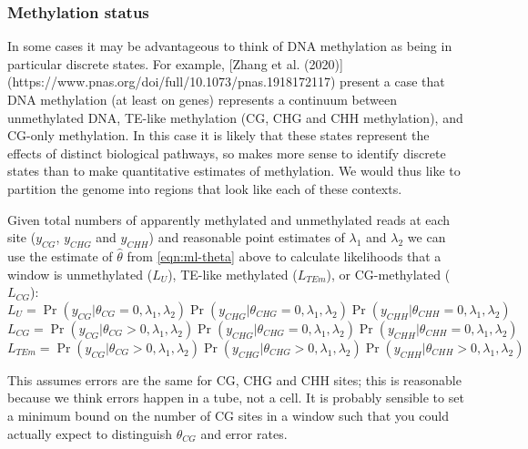 \documentclass[12pt,longbibliography]{article}
\begin{document}
\subsubsection{Methylation status}

In some cases it may be advantageous to think of DNA methylation as being in particular discrete states.
For example, [Zhang et al. (2020)](https://www.pnas.org/doi/full/10.1073/pnas.1918172117) present a case that DNA methylation (at least on genes) represents a continuum between unmethylated DNA, TE-like methylation (CG, CHG and CHH methylation), and CG-only methylation.
In this case it is likely that these states represent the effects of distinct biological pathways, so makes more sense to identify discrete states than to make quantitative estimates of methylation.
We would thus like to partition the genome into regions that look like each of these contexts.

Given total numbers of apparently methylated and unmethylated reads at each site ($y_{CG}$, $y_{CHG}$ and $y_{CHH}$) and reasonable point estimates of $\lambda_1$ and $\lambda_2$ we can use the estimate of $\hat{\theta}$ from \ref{eqn:ml-theta} above to calculate likelihoods that a window is unmethylated ($L_U$), TE-like methylated ($L_{TEm}$), or CG-methylated ($L_{CG}$):
\begin{equation}
    \label{eqn:lik-unmethylated}
    L_{U} = 
    \Pr( y_{CG} | \theta_{CG} =0, \lambda_1, \lambda_2)
    \Pr(y_{CHG} | \theta_{CHG}=0, \lambda_1, \lambda_2)
    \Pr(y_{CHH} | \theta_{CHH}=0, \lambda_1, \lambda_2)
\end{equation}
\begin{equation}
    \label{eqn:lik-mCG}
    L_{CG} = 
    \Pr( y_{CG} | \theta_{CG}>0, \lambda_1, \lambda_2)
    \Pr(y_{CHG} | \theta_{CHG}=0, \lambda_1, \lambda_2)
    \Pr(y_{CHH} | \theta_{CHH}=0, \lambda_1, \lambda_2)
\end{equation}
\begin{equation}
    \label{eqn:lik-TEm}
    L_{TEm} = 
    \Pr( y_{CG} | \theta_{CG}>0, \lambda_1, \lambda_2)
    \Pr(y_{CHG} | \theta_{CHG}>0, \lambda_1, \lambda_2)
    \Pr(y_{CHH} | \theta_{CHH}>0, \lambda_1, \lambda_2)
\end{equation}

This assumes errors are the same for CG, CHG and CHH sites; this is reasonable because we think errors happen in a tube, not a cell. It is probably sensible to set a minimum bound on the number of CG sites in a window such that you could actually expect to distinguish $\theta_{CG}$ and error rates.
\end{document}
